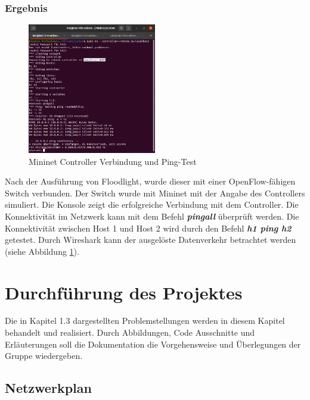 \documentclass[fontsize=12pt,paper=a4,open=any,parskip=half,
  twoside=false,toc=listof,toc=bibliography,fleqn,leqno,
  captions=nooneline,captions=tableabove,british]{scrbook}
\begin{document}
\newpage
\subsection{Ergebnis}


\setlength{\intextsep}{0pt}
\setlength{\columnsep}{15pt}
\begin{figure}
    \centering
    \includegraphics[width=0.5\textwidth]{Bilder/ping}
    \caption{Mininet Controller Verbindung und Ping-Test}
    \label{ping}
\end{figure}

Nach der Ausführung von Floodlight, wurde dieser mit einer OpenFlow-fähigen Switch verbunden. Der Switch wurde mit Mininet mit der Angabe des Controllers simuliert. Die Konsole zeigt die erfolgreiche Verbindung mit dem Controller. Die Konnektivität im Netzwerk kann mit dem Befehl \textit{\textbf{pingall}} überprüft werden. Die Konnektivität zwischen Host 1 und Host 2 wird durch den Befehl \textit{\textbf{h1 ping h2}} getestet. Durch Wireshark kann der ausgelöste Datenverkehr betrachtet werden (siehe Abbildung \ref{ping}).



\chapter{Durchführung des Projektes}
Die in Kapitel 1.3 dargestellten Problemstellungen werden in diesem Kapitel behandelt und realisiert. Durch Abbildungen, Code Ausschnitte und Erläuterungen soll die Dokumentation die Vorgehensweise und Überlegungen der Gruppe wiedergeben. 



\section{Netzwerkplan}
\end{document}
